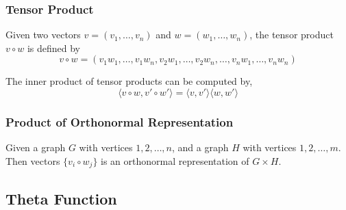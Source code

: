 \documentclass{beamer}
\begin{document}
                  \begin{frame}
                        \frametitle{Tensor Product}
                        \begin{definition}\label{def:tensorProduct}
                              Given two vectors $ v = \left(v_{1},\dots,v_{n}\right) $ and $ w = \left(w_{1},\dots,w_{n}\right) $, the tensor product $ v \circ w $ is defined by
                              \begin{equation}
                                    v \circ w = \left(
                                          v_{1}w_{1},\dots,v_{1}w_{n},
                                          v_{2}w_{1},\dots,v_{2}w_{n},
                                          \dots,
                                          v_{n}w_{1},\dots,v_{n}w_{n}
                                          \right)
                              \end{equation}
                        \end{definition}

                        \pause

                        \begin{lemma}
                              The inner product of tensor products can be computed by,
                              \begin{equation}
                                    \langle v \circ w, v' \circ w' \rangle = \langle v, v' \rangle \langle w, w' \rangle
                              \end{equation}
                        \end{lemma}

                  \end{frame}

                  \begin{frame}
                        \frametitle{Product of Orthonormal Representation}
                        \begin{lemma}
                              Given a graph $ G $ with vertices $ 1,2,\dots,n $, and a graph $ H $ with vertices $ 1,2,\dots,m $. Then vectors $\{ v_{i}\circ w_{j} \}$ is an orthonormal representation of $ G \times H $.
                        \end{lemma}
                  \end{frame}

            \subsection{Theta Function}
\end{document}
